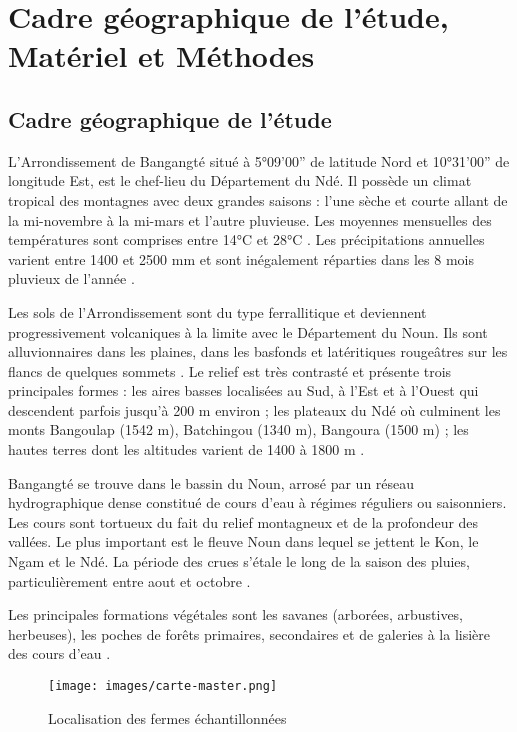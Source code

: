 \chapter{Cadre géographique de l'étude, Matériel et Méthodes}

\section{Cadre géographique de l'étude}
L'Arrondissement de Bangangté situé à 5°09'00” de latitude Nord et 10°31'00” de longitude Est, 
est le chef-lieu du Département du Ndé. Il possède un climat tropical des montagnes avec deux 
grandes saisons : l'une sèche et courte allant de la mi-novembre à la mi-mars et l'autre 
pluvieuse. Les moyennes mensuelles des températures sont comprises entre 14°C et 28°C 
. Les précipitations annuelles varient entre 1400 et 2500 mm et sont 
inégalement réparties dans les 8 mois pluvieux de l'année .
\par Les sols de l'Arrondissement sont du type ferrallitique et deviennent progressivement 
volcaniques à la limite avec le Département du Noun. Ils sont alluvionnaires dans les plaines, 
dans les basfonds et latéritiques rougeâtres sur les flancs de quelques sommets 
.
Le relief est très contrasté et présente trois principales formes : les aires basses localisées 
au Sud, à l'Est et à l'Ouest qui descendent parfois jusqu'à 200 m environ ; les plateaux du Ndé 
où culminent les monts Bangoulap (1542 m), Batchingou (1340 m), Bangoura (1500 m) ; les hautes 
terres dont les altitudes varient de 1400 à 1800 m .
\par Bangangté se trouve dans le bassin du Noun, arrosé par un réseau hydrographique dense 
constitué de cours d'eau à régimes réguliers ou saisonniers. Les cours sont tortueux du fait 
du relief montagneux et de la profondeur des vallées. Le plus important est le fleuve Noun 
dans lequel se jettent le Kon, le Ngam et le Ndé. La période des crues s'étale le long de la 
saison des pluies, particulièrement entre aout et octobre .
\par Les principales formations végétales sont les savanes (arborées, arbustives, herbeuses), 
les poches de forêts primaires, secondaires et de galeries à la lisière des cours d'eau 
.


\begin{figure}[!ht]
	\centering
	\texttt{[image: images/carte-master.png]}
	\caption[Localisation des fermes échantillonnées]{Localisation des fermes échantillonnées}
	\label{fig:cartes-master}
\end{figure}

